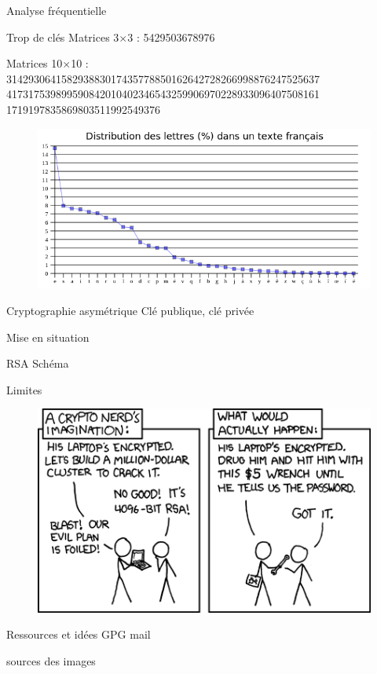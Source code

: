 \documentclass{beamer}
\begin{document}
\begin{frame}{Analyse fréquentielle}
  \begin{alertblock}{Trop de clés}
    Matrices 3$\times$3 : 5429503678976
    
    Matrices 10$\times$10 : \\
314293064158293883017435778850162642728266998876247525637
417317539899590842010402346543259906970228933096407508161
1719197835869803511992549376
    \end{alertblock}

\begin{figure}
\centering
\includegraphics[scale = 0.4]{distribution.png}
\end{figure}
  \end{frame}


\begin{frame}{Cryptographie asymétrique}
  Clé publique, clé privée

  Mise en situation
\end{frame}

\begin{frame}{RSA}
  Schéma
  \end{frame}

\begin{frame}{Limites}
  \begin{figure}
    \centering
    \includegraphics[scale = 0.5]{xkcdsecurity.png}
  \end{figure}
\end{frame}

\begin{frame}{Ressources et idées}
  GPG mail
  
  sources des images
  \end{frame}
\end{document}
